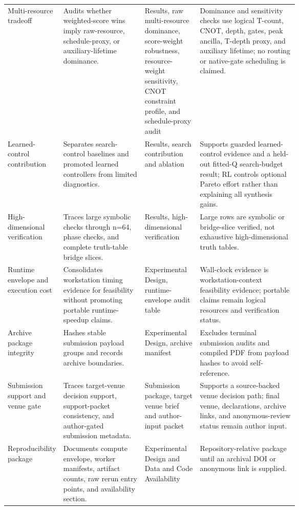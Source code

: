 \begin{tabularx}{\linewidth}{>{\raggedright\arraybackslash}p{0.18\linewidth}>{\raggedright\arraybackslash}p{0.29\linewidth}>{\raggedright\arraybackslash}p{0.19\linewidth}>{\raggedright\arraybackslash}X}
Multi-resource tradeoff & Audits whether weighted-score wins imply raw-resource, schedule-proxy, or auxiliary-lifetime dominance. & Results, raw multi-resource dominance, score-weight robustness, resource-weight sensitivity, CNOT constraint profile, and schedule-proxy audit & Dominance and sensitivity checks use logical T-count, CNOT, depth, gates, peak ancilla, T-depth proxy, and auxiliary lifetime; no routing or native-gate scheduling is claimed. \\
Learned-control contribution & Separates search-control baselines and promoted learned controllers from limited diagnostics. & Results, search contribution and ablation & Supports guarded learned-control evidence and a held-out fitted-Q search-budget result; RL controls optional Pareto effort rather than explaining all synthesis gains. \\
High-dimensional verification & Traces large symbolic checks through n=64, phase checks, and complete truth-table bridge slices. & Results, high-dimensional verification & Large rows are symbolic or bridge-slice verified, not exhaustive high-dimensional truth tables. \\
Runtime envelope and execution cost & Consolidates workstation timing evidence for feasibility without promoting portable runtime-speedup claims. & Experimental Design, runtime-envelope audit table & Wall-clock evidence is workstation-context feasibility evidence; portable claims remain logical resources and verification status. \\
Archive package integrity & Hashes stable submission payload groups and records archive boundaries. & Experimental Design, archive manifest & Excludes terminal submission audits and compiled PDF from payload hashes to avoid self-reference. \\
Submission support and venue gate & Traces target-venue decision support, support-packet consistency, and author-gated submission metadata. & Submission package, target venue brief and author-input packet & Supports a source-backed venue decision path; final venue, declarations, archive links, and anonymous-review status remain author input. \\
Reproducibility package & Documents compute envelope, worker manifests, artifact counts, raw rerun entry points, and availability section. & Experimental Design and Data and Code Availability & Repository-relative package until an archival DOI or anonymous link is supplied. \\
\bottomrule
\end{tabularx}
